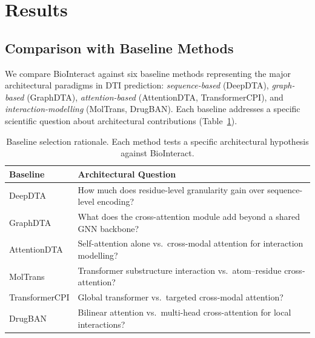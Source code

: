\documentclass[fleqn,10pt]{wlscirep}
\begin{document}
\section{Results}
\label{sec:results}

\subsection{Comparison with Baseline Methods}

We compare BioInteract against six baseline methods representing the major
architectural paradigms in DTI prediction:
\emph{sequence-based} (DeepDTA\cite{ozturk2018deepdta}),
\emph{graph-based} (GraphDTA\cite{nguyen2021graphdta}),
\emph{attention-based} (AttentionDTA,\cite{zhao2022attentiondta}
TransformerCPI\cite{chen2020transformercpi}), and
\emph{interaction-modelling} (MolTrans,\cite{huang2021moltrans}
DrugBAN\cite{bai2023drugban}).
Each baseline addresses a specific scientific question about architectural
contributions (Table~\ref{tab:baseline_questions}).

\begin{table}[htbp]
\centering
\caption{Baseline selection rationale.  Each method tests a specific
  architectural hypothesis against BioInteract.}
\label{tab:baseline_questions}
\begin{tabular}{lp{6.5cm}}
\toprule
\textbf{Baseline} & \textbf{Architectural Question} \\
\midrule
DeepDTA       & How much does residue-level granularity gain over
                sequence-level encoding? \\
GraphDTA      & What does the cross-attention module add beyond a shared
                GNN backbone? \\
AttentionDTA  & Self-attention alone vs.\ cross-modal attention for
                interaction modelling? \\
MolTrans      & Transformer substructure interaction vs.\ atom--residue
                cross-attention? \\
TransformerCPI & Global transformer vs.\ targeted cross-modal attention? \\
DrugBAN       & Bilinear attention vs.\ multi-head cross-attention for
                local interactions? \\
\bottomrule
\end{tabular}
\end{table}
\end{document}
